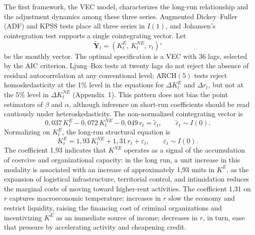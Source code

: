\documentclass[ecta,nameyear,draft]{econsocart}
\theoremstyle{plain}
\theoremstyle{definition}
\newcommand{\1}{\mathbf{1}}
\begin{document}

The first framework, the VEC model, characterizes the long-run relationship and the adjustment dynamics among these three series. Augmented Dickey--Fuller (ADF) and KPSS tests place all three series in $I(1)$, and Johansen's cointegration test supports a single cointegrating vector. Let
\[
\tilde{\mathbf{Y}}_t = (K^E_t,\, K^{NE}_t,\, r_t)'
\]
be the monthly vector. The optimal specification is a VEC with 36 lags, selected by the AIC criterion. Ljung--Box tests at twenty lags do not reject the absence of residual autocorrelation at any conventional level; ARCH$(5)$ tests reject homoskedasticity at the 1\% level in the equations for $\Delta K^E_t$ and $\Delta r_t$, but not at the 5\% level in $\Delta K^{NE}_t$ (Appendix~1). This pattern does not bias the point estimators of $\beta$ and $\alpha$, although inference on short-run coefficients should be read cautiously under heteroskedasticity. The non-normalized cointegrating vector is
\begin{equation}
0{,}037\,K^{E}_t - 0{,}072\,K^{NE}_t - 0{,}049\,r_t = \tilde{\varepsilon}_t,
\qquad \tilde{\varepsilon}_t \sim I(0).
\label{eq:vec-coint}
\end{equation}
Normalizing on $K^E_t$, the long-run structural equation is
\begin{equation}
K^E_t = 1{,}93\,K^{NE}_t + 1{,}31\,r_t + \varepsilon_t,
\qquad \varepsilon_t \sim I(0).
\label{eq:vec-longrun}
\end{equation}
The coefficient 1{,}93 indicates that $K^{NE}$ operates as a signal of the accumulation of coercive and organizational capacity: in the long run, a unit increase in this modality is associated with an increase of approximately 1{,}93 units in $K^E$, as the expansion of logistical infrastructure, territorial control, and intimidation reduces the marginal costs of moving toward higher-rent activities. The coefficient 1{,}31 on $r$ captures macroeconomic temperature: increases in $r$ slow the economy and restrict liquidity, raising the financing cost of criminal organizations and incentivizing $K^E$ as an immediate source of income; decreases in $r$, in turn, ease that pressure by accelerating activity and cheapening credit.
\end{document}
